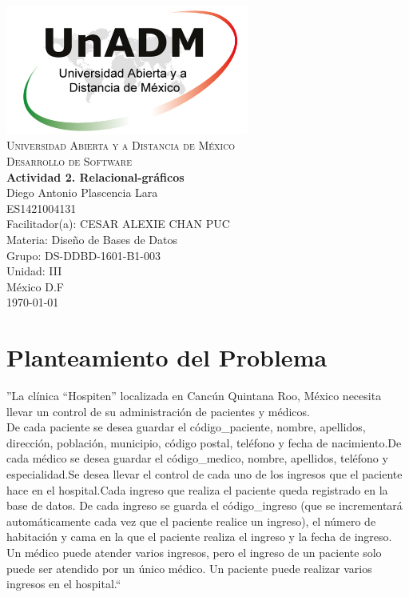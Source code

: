 \documentclass[spanish,12pt,letterpapper]{article}
\begin{document}
	\begin{titlepage}
		\begin{center}
			\includegraphics[width=0.6\textwidth]{../logoUnADM}~\\[1cm] 
			\textsc{Universidad Abierta y a Distancia de México}\\[0.8cm]
			\textsc{Desarrollo de Software}\\[1.8cm]
			
			\textbf{ \Large Actividad 2. Relacional-gráficos  }\\[3cm]
			
			Diego Antonio Plascencia Lara\\ ES1421004131 \\[0.4cm]
			Facilitador(a): CESAR ALEXIE CHAN PUC  \\
			Materia: Diseño de Bases de Datos\\
			Grupo: DS-DDBD-1601-B1-003 \\
			Unidad: III \\
			
			\vfill México D.F\\{\today}
			
		\end{center}
	\end{titlepage}
	
	\section{Planteamiento del Problema}	
	''La clínica “Hospiten” localizada en Cancún Quintana Roo, México necesita llevar un control de su administración de pacientes y médicos.\\
	
	De cada paciente se desea guardar el código\_paciente, nombre, apellidos, dirección, población, municipio, código postal, teléfono y fecha de nacimiento.De cada médico se desea guardar el código\_medico, nombre, apellidos, teléfono y especialidad.Se desea llevar el control de cada uno de los ingresos que el paciente hace en el hospital.Cada ingreso que realiza el paciente queda registrado en la base de datos. De cada ingreso se guarda el código\_ingreso (que se incrementará automáticamente cada vez que el paciente realice un ingreso), el número de habitación y cama en la que el paciente realiza el ingreso y la fecha de ingreso. Un médico puede atender varios ingresos, pero el ingreso de un paciente solo puede ser atendido por un único médico. Un paciente puede realizar varios ingresos en el hospital.``\\
	
\end{document}
